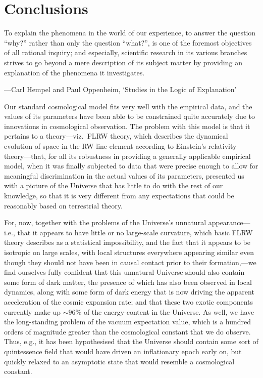 \chapter{Conclusions}
 \epigraph{To explain the phenomena in the world of our experience, to answer the question ``why?'' rather than only the question ``what?'', is one of the foremost objectives of all rational inquiry; and especially, scientific research in its various branches strives to go beyond a mere description of its subject matter by providing an explanation of the phenomena it investigates.}{---Carl Hempel and Paul Oppenheim, `Studies in the Logic of Explanation'}
Our standard cosmological model fits very well with the empirical data, and the values of its parameters have been able to be constrained quite accurately due to innovations in cosmological observation. The problem with this model is that it pertains to a theory---viz.\ FLRW theory, which describes the dynamical evolution of space in the RW line-element according to Einstein's relativity theory---that, for all its robustness in providing a generally applicable empirical model, when it was finally subjected to data that were precise enough to allow for meaningful discrimination in the actual values of its parameters, presented us with a picture of the Universe that has little to do with the rest of our knowledge, so that it is very different from any expectations that could be reasonably based on terrestrial theory. 

For, now, together with the problems of the Universe's unnatural appearance---i.e., that it appears to have little or no large-scale curvature, which basic FLRW theory describes as a statistical impossibility, and the fact that it appears to be isotropic on large scales, with local structures everywhere appearing similar even though they should not have been in causal contact prior to their formation,---we find ourselves fully confident that this unnatural Universe should also contain some form of dark matter, the presence of which has also been observed in local dynamics, along with some form of dark energy that is now driving the apparent acceleration of the cosmic expansion rate; and that these two exotic components currently make up $\sim96\%$ of the energy-content in the Universe. As well, we have the long-standing problem of the vacuum expectation value, which is a hundred orders of magnitude greater than the cosmological constant that we do observe. Thus, e.g., it has been hypothesised that the Universe should contain some sort of quintessence field that would have driven an inflationary epoch early on, but quickly relaxed to an asymptotic state that would resemble a cosmological constant. 


